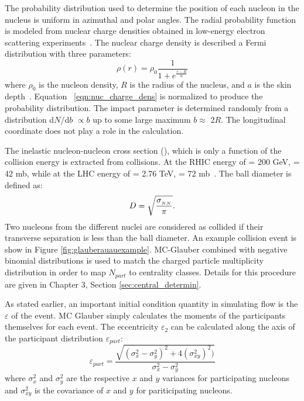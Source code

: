 The probability distribution used to determine the position of each nucleon in the nucleus is uniform in azimuthal and polar angles. The radial probability function is modeled from nuclear charge densities obtained in low-energy electron scattering experiments~\cite{DEVRIES1987495}. The nuclear charge density is described a Fermi distribution with three parameters:
\begin{equation}
\rho(r) = \rho_0\frac{1}{1+e^{\frac{r-R}{a}}}
\label{eqn:nuc_charge_dens}
\end{equation}
where $\rho_0$ is the nucleon density, $R$ is the radius of the nucleus, and $a$ is the skin depth~\cite{Alver:2008aq}. Equation ~\ref{eqn:nuc_charge_dens} is normalized to produce the probability distribution. The impact parameter is determined randomly from a distribution d$N$/d$b$ $\propto b$ up to some large maximum $b \approx$ 2$R$. The longitudinal coordinate does not play a role in the calculation. 

The inelastic nucleon-nucleon cross section (\signn), which is only a function of the collision energy is extracted from \pp collisions. At the RHIC energy of \sqsn = 200 GeV, \signn = 42 mb, while at the LHC energy of \sqsn = 2.76 TeV, \signn = 72 mb~\cite{annurev.nucl.57.090506.123020}. The ball diameter is defined as:
\begin{equation}
D = \sqrt{\frac{\mbox{$\sigma_{_{NN}}$}}{\pi}}.
\end{equation}
Two nucleons from the different nuclei are considered as collided if their transverse separation is less than the ball diameter. An example \auau collision event is show in Figure \ref{fig:glauberauauexample}. MC-Glauber combined with negative binomial distributions is used to match the charged particle multiplicity distribution in order to map $N_{part}$ to centrality classes. Details for this procedure are given in Chapter 3, Section \ref{sec:central_determin}.

As stated earlier, an important initial condition quantity in simulating flow is the $\varepsilon$ of the event. MC Glauber simply calculates the moments of the participants themselves for each event. The eccentricity $\varepsilon_2$ can be calculated along the axis of the participant distribution $\varepsilon_{part}$:
\begin{equation}
\varepsilon_{part} = \frac{\sqrt{(\sigma_x^2-\sigma_y^2)^2+4(\sigma_{xy}^2)^2)}}{\sigma_x^2-\sigma_y^2}
\end{equation}
where $\sigma_{x}^2$ and $\sigma_y^2$ are the respective $x$ and $y$ variances for participating nucleons and $\sigma_{xy}^2$ is the covariance of $x$ and $y$ for pariticipating nucleons.

